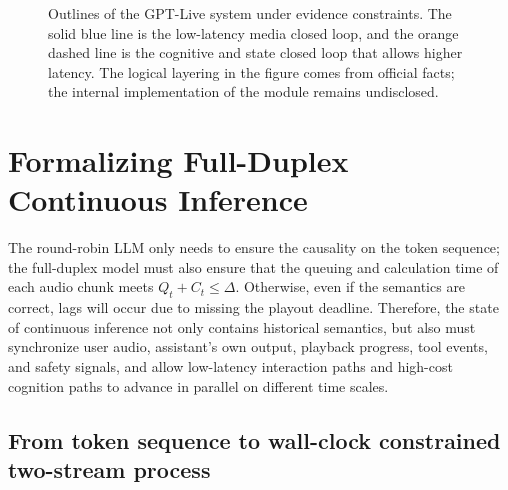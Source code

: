 \documentclass[UTF8,fontset=none,a4paper,10pt]{ctexart}
\begin{document}
\begin{figure}[H]
\centering
{}
\caption{Outlines of the GPT-Live system under evidence constraints. The solid blue line is the low-latency media closed loop, and the orange dashed line is the cognitive and state closed loop that allows higher latency. The logical layering in the figure comes from official facts; the internal implementation of the module remains undisclosed.}
\label{fig:official-architecture}
\end{figure}

\section{Formalizing Full-Duplex Continuous Inference}

The round-robin LLM only needs to ensure the causality on the token sequence; the full-duplex model must also ensure that the queuing and calculation time of each audio chunk meets $Q_t+C_t\leq\Delta$. Otherwise, even if the semantics are correct, lags will occur due to missing the playout deadline. Therefore, the state of continuous inference not only contains historical semantics, but also must synchronize user audio, assistant's own output, playback progress, tool events, and safety signals, and allow low-latency interaction paths and high-cost cognition paths to advance in parallel on different time scales.

\subsection{From token sequence to wall-clock constrained two-stream process}
\end{document}
